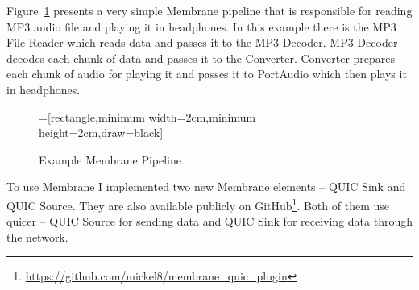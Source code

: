 Figure~\ref{fig:example-membrane-pipeline} presents a very simple Membrane pipeline that is responsible for reading
MP3 audio file and playing it in headphones.
In this example there is the MP3 File Reader which reads data and passes it to the MP3 Decoder.
MP3 Decoder decodes each chunk of data and passes it to the Converter.
Converter prepares each chunk of audio for playing it and passes it to PortAudio which then plays it in headphones.
\begin{figure}[h]
    \centering
    =[rectangle,minimum width=2cm,minimum height=2cm,draw=black]
    \caption{Example Membrane Pipeline}
    \label{fig:example-membrane-pipeline}
\end{figure}

To use Membrane I implemented two new Membrane elements -- QUIC Sink and QUIC Source.
They are also available publicly on GitHub\footnote{\url{https://github.com/mickel8/membrane_quic_plugin}}.
Both of them use quicer -- QUIC Source for sending data and QUIC Sink for receiving data through the network.


